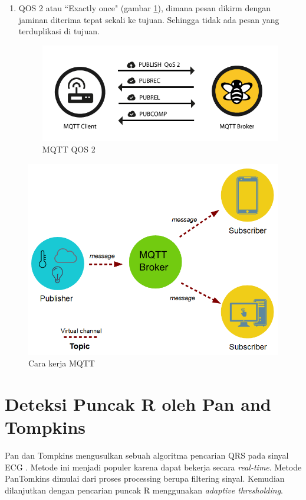 \begin{enumerate}
	\item QOS 2 atau ``Exactly once" (gambar \ref{fig:mqtt2}), dimana pesan dikirm dengan jaminan diterima tepat sekali ke tujuan. Sehingga tidak ada pesan yang terduplikasi di tujuan.	
	
\begin{figure}[H]
	\centering
	\includegraphics[scale=0.3]{images/qos2.png}	
	\caption{MQTT QOS 2}
	\label{fig:mqtt2}
\end{figure}
\end{enumerate}

\begin{figure}[H]
	\centering
	\includegraphics[scale=0.35]{images/mqtt.png}
	\caption{Cara kerja MQTT}
	\label{fig:how_mqtt}
\end{figure}

\section{Deteksi Puncak R oleh Pan and Tompkins}\label{bab2_pantom}
Pan dan Tompkins mengusulkan sebuah algoritma pencarian QRS pada sinyal ECG \cite{pantom}. Metode ini menjadi populer karena dapat bekerja secara \textit{real-time}. Metode PanTomkins dimulai dari proses processing berupa filtering sinyal. Kemudian dilanjutkan dengan pencarian puncak R menggunakan \textit{adaptive thresholding}. 

